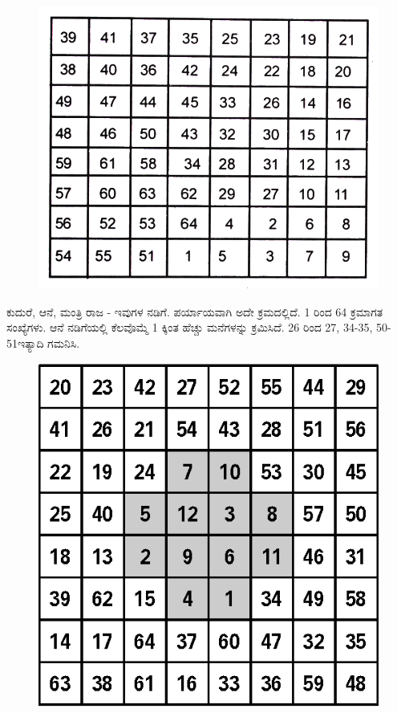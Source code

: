 \begin{figure}[H]
\includegraphics{src/figures/chap6/fig6-13.jpg}
\end{figure}

ಕುದುರೆ, ಆನೆ, ಮಂತ್ರಿ ರಾಜ - ಇವುಗಳ ನಡಿಗೆ. ಪರ್ಯಾಯವಾಗಿ ಅದೇ ಕ್ರಮದಲ್ಲಿದೆ. 1 ರಿಂದ 64 ಕ್ರಮಾಗತ ಸಂಖ್ಯೆಗಳು. ಆನೆ ನಡಿಗೆಯಲ್ಲಿ ಕೆಲವೊಮ್ಮೆ 1 ಕ್ಕಿಂತ ಹೆಚ್ಚು ಮನೆಗಳನ್ನು ಕ್ರಮಿಸಿದೆ. 26 ರಿಂದ 27, 34-35, 50-51ಇತ್ಯಾದಿ ಗಮನಿಸಿ.
\begin{figure}[H]
\includegraphics{src/figures/chap6/fig6-14.eps}
\end{figure}

